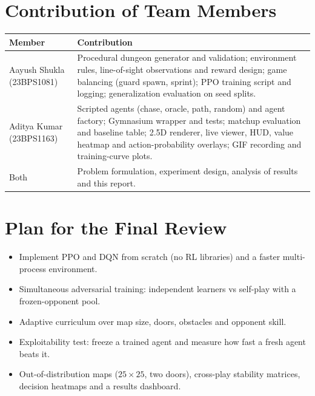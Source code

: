 \documentclass[11pt,a4paper]{article}
\begin{document}
\section{Contribution of Team Members}
\begin{center}
\begin{tabularx}{\textwidth}{lX}
\toprule
\textbf{Member} & \textbf{Contribution}\\
\midrule
Aayush Shukla (23BPS1081) &
Procedural dungeon generator and validation; environment rules, line-of-sight observations and
reward design; game balancing (guard spawn, sprint); PPO training script and logging;
generalization evaluation on seed splits.\\
Aditya Kumar (23BPS1163) &
Scripted agents (chase, oracle, path, random) and agent factory; Gymnasium wrapper and tests;
matchup evaluation and baseline table; 2.5D renderer, live viewer, HUD, value heatmap and
action-probability overlays; GIF recording and training-curve plots.\\
Both &
Problem formulation, experiment design, analysis of results and this report.\\
\bottomrule
\end{tabularx}
\end{center}

\section{Plan for the Final Review}
\begin{itemize}
  \item Implement PPO and DQN from scratch (no RL libraries) and a faster multi-process environment.
  \item Simultaneous adversarial training: independent learners vs self-play with a frozen-opponent pool.
  \item Adaptive curriculum over map size, doors, obstacles and opponent skill.
  \item Exploitability test: freeze a trained agent and measure how fast a fresh agent beats it.
  \item Out-of-distribution maps ($25\times25$, two doors), cross-play stability matrices, decision
        heatmaps and a results dashboard.
\end{itemize}
\end{document}

